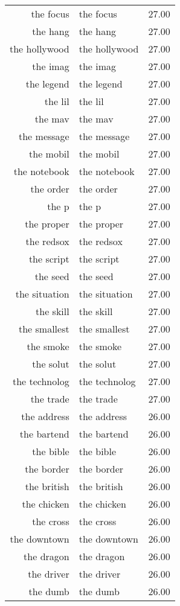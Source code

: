 \begin{table}[ht]
\begin{tabular}{rlr}
  the focus & the focus & 27.00 \\ 
  the hang & the hang & 27.00 \\ 
  the hollywood & the hollywood & 27.00 \\ 
  the imag & the imag & 27.00 \\ 
  the legend & the legend & 27.00 \\ 
  the lil & the lil & 27.00 \\ 
  the mav & the mav & 27.00 \\ 
  the message & the message & 27.00 \\ 
  the mobil & the mobil & 27.00 \\ 
  the notebook & the notebook & 27.00 \\ 
  the order & the order & 27.00 \\ 
  the p & the p & 27.00 \\ 
  the proper & the proper & 27.00 \\ 
  the redsox & the redsox & 27.00 \\ 
  the script & the script & 27.00 \\ 
  the seed & the seed & 27.00 \\ 
  the situation & the situation & 27.00 \\ 
  the skill & the skill & 27.00 \\ 
  the smallest & the smallest & 27.00 \\ 
  the smoke & the smoke & 27.00 \\ 
  the solut & the solut & 27.00 \\ 
  the technolog & the technolog & 27.00 \\ 
  the trade & the trade & 27.00 \\ 
  the address & the address & 26.00 \\ 
  the bartend & the bartend & 26.00 \\ 
  the bible & the bible & 26.00 \\ 
  the border & the border & 26.00 \\ 
  the british & the british & 26.00 \\ 
  the chicken & the chicken & 26.00 \\ 
  the cross & the cross & 26.00 \\ 
  the downtown & the downtown & 26.00 \\ 
  the dragon & the dragon & 26.00 \\ 
  the driver & the driver & 26.00 \\ 
  the dumb & the dumb & 26.00 \\ 

\end{tabular}
\end{table}

